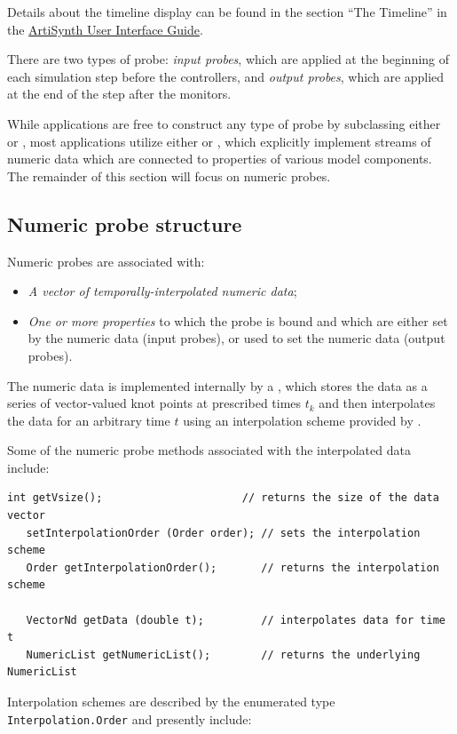 Details about the timeline display can be found in
the section ``The Timeline'' in the
\href{\artisynthDocBase/html/uiguide/uiguide.html}{
ArtiSynth User Interface Guide}.

There are two types of probe: {\it input probes}, which are applied at
the beginning of each simulation step before the controllers, and {\it
output probes}, which are applied at the end of the step after the
monitors.

While applications are free to construct any type of probe by
subclassing either  or
, most applications
utilize either  or
, which
explicitly implement streams of numeric data which are connected to
properties of various model components.  The remainder of this section
will focus on numeric probes.

\subsection{Numeric probe structure}
\label{NumericProbeStructure:sec}

Numeric probes are associated with:

\begin{itemize}

\item {\it A vector of temporally-interpolated numeric data};

\item {\it One or more properties} to which the probe is bound and
which are either set by the numeric data (input probes), or used to
set the numeric data (output probes).

\end{itemize}

The numeric data is implemented internally by a
, which stores the data
as a series of vector-valued knot points at prescribed times $t_k$ and
then interpolates the data for an arbitrary time $t$ using an
interpolation scheme provided by
.

Some of the numeric probe methods associated with the interpolated
data include:
%
\begin{lstlisting}[]
   int getVsize();                      // returns the size of the data vector
   setInterpolationOrder (Order order); // sets the interpolation scheme
   Order getInterpolationOrder();       // returns the interpolation scheme

   VectorNd getData (double t);         // interpolates data for time t
   NumericList getNumericList();        // returns the underlying NumericList
\end{lstlisting}
%
Interpolation schemes are described by the enumerated type {\tt
Interpolation.Order} and presently include:

